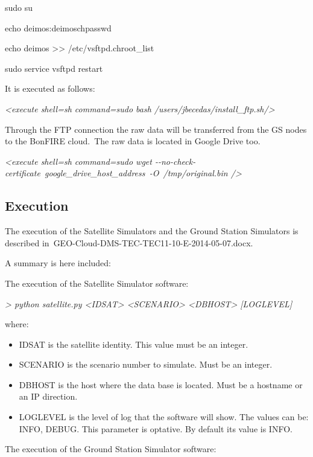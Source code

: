\documentclass[a4paper]{article}
\newcommand\liststyleLFOxliii{%
\renewcommand\labelitemi{[F0B7?]}
\renewcommand\labelitemii{o}
\renewcommand\labelitemiii{[F0A7?]}
\renewcommand\labelitemiv{[F0B7?]}
}
\begin{document}
{\ttfamily
sudo su}

{\ttfamily
echo {\textquotedbl}deimos:deimos{\textquotedbl}{\textbar}chpasswd}

{\ttfamily
echo {\textquotedbl}deimos{\textquotedbl} {\textgreater}{\textgreater}
/etc/vsftpd.chroot\_list}

{\ttfamily
sudo service vsftpd restart}


\bigskip

It is executed as follows:


\bigskip

{\itshape
{\textless}execute shell={\textquotedbl}sh{\textquotedbl}
command={\textquotedbl}sudo bash
/users/jbecedas/install\_ftp.sh{\textquotedbl}/{\textgreater}}


\bigskip

Through the FTP connection the raw data will be transferred from the GS
nodes to the BonFIRE cloud.\ The raw data is located in Google Drive
too.


\bigskip

\textit{{\textless}execute shell={\textquotedbl}sh{\textquotedbl}
command={\textquotedbl}sudo wget
-{}-no-check-certificate\ }\textit{\textcolor[rgb]{0.7529412,0.0,0.0}{google\_drive\_host\_address}}\textit{\textcolor[rgb]{0.7529412,0.0,0.0}{\ }}\textit{{}-O\ }\textit{/tmp/original.bin
{\textquotedbl}/{\textgreater}}\newline


\subsection[Execution]{Execution}
\hypertarget{Toc390097015}{}
\bigskip

The execution of the Satellite Simulators and the Ground Station
Simulators is described
in\ GEO-Cloud-DMS-TEC-TEC11-10-E-2014-05-07.docx.\ 


\bigskip

A summary is here included:


\bigskip

The execution of the Satellite Simulator software:

{\itshape
{\textgreater} python satellite.py {\textless}IDSAT{\textgreater}
{\textless}SCENARIO{\textgreater} {\textless}DBHOST{\textgreater}
[LOGLEVEL]}

where:

\liststyleLFOxliii
\begin{itemize}
\item IDSAT is the satellite identity. This value must be an integer.\ 
\item SCENARIO is the scenario number to simulate. Must be an integer.
\item DBHOST is the host where the data base is located. Must be a
hostname or an IP direction.
\item LOGLEVEL is the level of log that the software will show. The
values can be: INFO, DEBUG. This parameter is optative. By default its
value is INFO.\ 
\end{itemize}
The execution of the Ground Station Simulator software:
\end{document}
